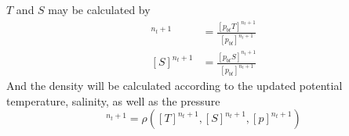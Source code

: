 $T$ and $S$ may be calculated by 
\bese
\begin{align}
  [T]^{n_{t}+1} &=\frac{[p_{bt}T]^{n_{t}+1}}{[p_{bt}]^{n_{t}+1}}\\
  [S]^{n_{t}+1} &=\frac{[p_{bt}S]^{n_{t}+1}}{[p_{bt}]^{n_{t}+1}}
\end{align}
\ense
 And the density will be calculated according to the updated potential
temperature, salinity, as well as the pressure
\begin{equation}
[\rho]^{n_{t}+1}=\rho\left([T]^{n_{t}+1},[S]^{n_{t}+1},[p]^{n_{t}+1}\right)
\end{equation}
